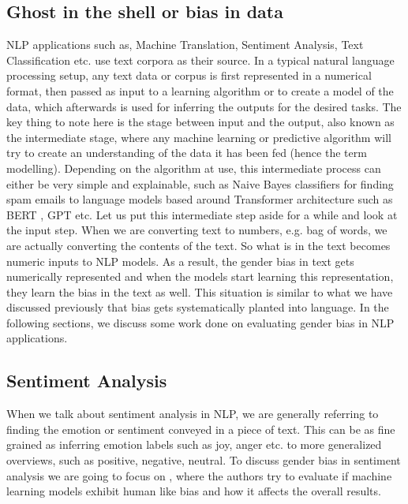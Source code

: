 \documentclass{article}
\begin{document}
\subsection*{Ghost in the shell or bias in data}
NLP applications such as, Machine Translation, Sentiment Analysis, Text Classification etc. use text corpora as their source. In a typical natural language processing setup, any text data or corpus is first represented in a numerical format, then passed as input to a learning algorithm or to create a model of the data, which afterwards is used for inferring the outputs for the desired tasks. The key thing to note here is the stage between input and the output, also known as the intermediate stage, where any machine learning or predictive algorithm will try to create an understanding of the data it has been fed (hence the term modelling). Depending on the algorithm at use, this intermediate process can either be very simple and explainable, such as Naive Bayes classifiers for finding spam emails to language models based around Transformer architecture such as BERT \cite{devlin-etal-2019-bert}, GPT \cite{brown2020language} etc. Let us put this intermediate step aside for a while and look at the input step. When we are converting text to numbers, e.g. bag of words, we are actually converting the contents of the text. So what is in the text becomes numeric inputs to NLP models. As a result, the gender bias in text gets numerically represented and when the models start learning this representation, they learn the bias in the text as well. This situation is similar to what we have discussed previously that bias gets systematically planted into language. In the following sections, we discuss some work done on evaluating gender bias in NLP applications.

\subsection*{Sentiment Analysis}
When we talk about sentiment analysis in NLP, we are generally referring to finding the emotion or sentiment conveyed in a piece of text. This can be as fine grained as inferring emotion labels such as joy, anger etc. to more generalized overviews, such as positive, negative, neutral. To discuss gender bias in sentiment analysis we are going to focus on \cite{kiritchenko2018examining}, where the authors try to evaluate if machine learning models exhibit human like bias and how it affects the overall results. \\
\end{document}
